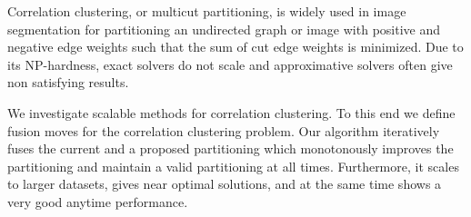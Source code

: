 Correlation clustering, or multicut partitioning,
is widely used in image segmentation for
partitioning an undirected graph or image with positive and negative edge weights 
such that the sum of cut edge weights is minimized.
%
Due to its NP-hardness, exact solvers do not scale and approximative solvers often give non satisfying results.

We investigate scalable methods for correlation clustering.
To this end we define fusion moves for the correlation clustering problem.
Our algorithm iteratively fuses the current and a proposed partitioning which  monotonously improves
the partitioning and maintain a valid partitioning at all times.
Furthermore, it scales to larger datasets, gives near optimal solutions, and at the same time shows
a very good anytime performance.
